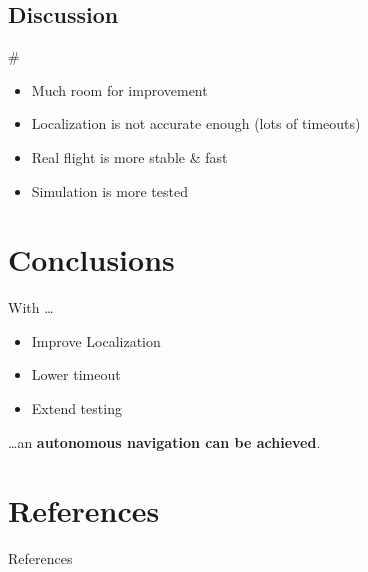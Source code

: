 \documentclass[]{beamer}
\def\mOrangeItem{\item[\textcolor{orange}{\textbullet}]}
\newcommand{\mSlideTitle}{{{\color{gray}\secname}} \# \subsecname}
\begin{document}

\subsection{Discussion}
\begin{frame}{\mSlideTitle}
  \begin{itemize}
    \mOrangeItem Much room for improvement
    \mOrangeItem Localization is not accurate enough (lots of timeouts)
    \mOrangeItem Real flight is more stable \& fast
    \mOrangeItem Simulation is more tested
  \end{itemize}
\end{frame}

\section{Conclusions}
\begin{frame}{\secname}
  With \dots
  \begin{itemize}
    \mOrangeItem Improve Localization
    \mOrangeItem Lower timeout
    \mOrangeItem Extend testing
  \end{itemize}
  \dots an \textbf{autonomous navigation can be achieved}.
\end{frame}

\section{References}
\begin{frame}[allowframebreaks]{References}
  \printbibliography%
\end{frame}
\end{document}
